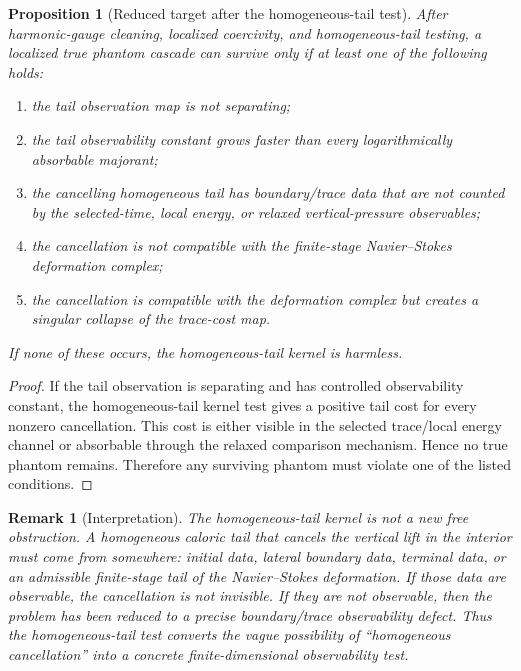 \documentclass[11pt]{article}
\numberwithin{equation}{section}
\newtheorem{proposition}[theorem]{Proposition}
\newtheorem{remark}[theorem]{Remark}
\begin{document}
\begin{proposition}[Reduced target after the homogeneous-tail test]
After harmonic-gauge cleaning, localized coercivity, and homogeneous-tail testing, a localized true phantom cascade can survive only if at least one of the following holds:

\begin{enumerate}
\item the tail observation map is not separating;
\item the tail observability constant grows faster than every logarithmically absorbable majorant;
\item the cancelling homogeneous tail has boundary/trace data that are not counted by the selected-time, local energy, or relaxed vertical-pressure observables;
\item the cancellation is not compatible with the finite-stage Navier--Stokes deformation complex;
\item the cancellation is compatible with the deformation complex but creates a singular collapse of the trace-cost map.
\end{enumerate}

If none of these occurs, the homogeneous-tail kernel is harmless.
\end{proposition}

\begin{proof}
If the tail observation is separating and has controlled observability constant, the homogeneous-tail kernel test gives a positive tail cost for every nonzero cancellation. This cost is either visible in the selected trace/local energy channel or absorbable through the relaxed comparison mechanism. Hence no true phantom remains. Therefore any surviving phantom must violate one of the listed conditions.
\end{proof}

\begin{remark}[Interpretation]
The homogeneous-tail kernel is not a new free obstruction. A homogeneous caloric tail that cancels the vertical lift in the interior must come from somewhere: initial data, lateral boundary data, terminal data, or an admissible finite-stage tail of the Navier--Stokes deformation. If those data are observable, the cancellation is not invisible. If they are not observable, then the problem has been reduced to a precise boundary/trace observability defect. Thus the homogeneous-tail test converts the vague possibility of ``homogeneous cancellation'' into a concrete finite-dimensional observability test.
\end{remark}
\end{document}
